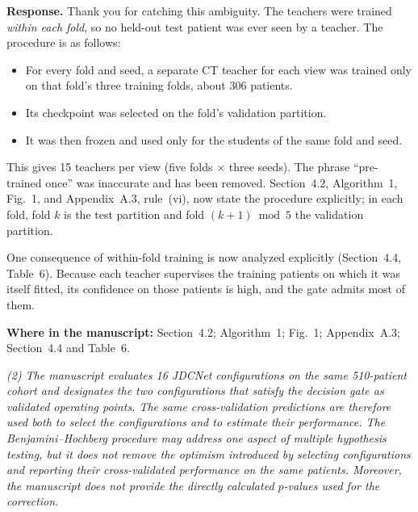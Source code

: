 \documentclass[11pt]{article}
\newenvironment{rcomment}{\par\noindent\begin{minipage}{\linewidth}\itshape\color{black!75}}{\end{minipage}\par}
\newcommand{\where}[1]{\par\noindent\textbf{Where in the manuscript:} #1\par}
\begin{document}
\textbf{Response.} Thank you for catching this ambiguity. The teachers were
trained \emph{within each fold}, so no held-out test patient was ever seen by a
teacher. The procedure is as follows:
\begin{itemize}[leftmargin=1.4em]
  \item For every fold and seed, a separate CT teacher for each view was trained only on that fold's three training folds, about 306 patients.
  \item Its checkpoint was selected on the fold's validation partition.
  \item It was then frozen and used only for the students of the same fold and seed.
\end{itemize}
This gives 15 teachers per view (five folds $\times$ three seeds). The phrase
``pre-trained once'' was inaccurate and has been removed. Section~4.2,
Algorithm~1, Fig.~1, and Appendix~A.3, rule~(vi), now state the procedure
explicitly; in each fold, fold $k$ is the test partition and fold $(k{+}1) \bmod 5$ the
validation partition.

One consequence of within-fold training is now analyzed explicitly
(Section~4.4, Table~6). Because each teacher supervises the training patients
on which it was itself fitted, its confidence on those patients is high, and
the gate admits most of them.
\where{Section~4.2; Algorithm~1; Fig.~1; Appendix~A.3; Section~4.4 and Table~6.}

\begin{rcomment}
(2) The manuscript evaluates 16 JDCNet configurations on the same 510-patient cohort and designates the two configurations that satisfy the decision gate as validated operating points. The same cross-validation predictions are therefore used both to select the configurations and to estimate their performance. The Benjamini--Hochberg procedure may address one aspect of multiple hypothesis testing, but it does not remove the optimism introduced by selecting configurations and reporting their cross-validated performance on the same patients. Moreover, the manuscript does not provide the directly calculated $p$-values used for the correction.
\end{rcomment}
\end{document}
